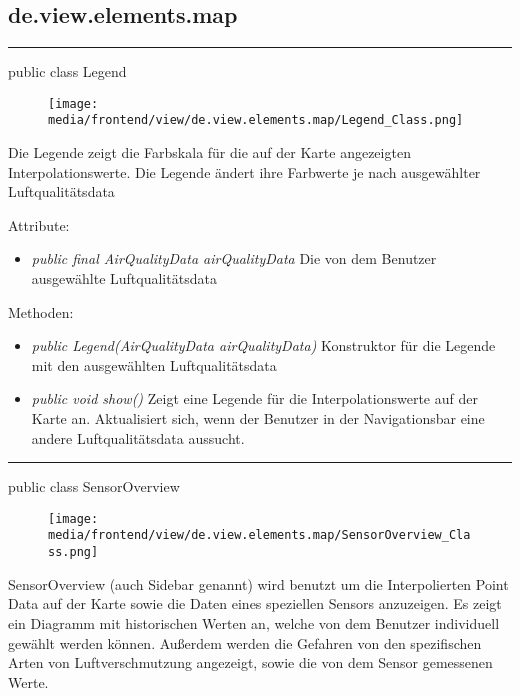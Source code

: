 \subsection{de.view.elements.map}

\rule{\textwidth}{0.4pt} 
public class Legend

\begin{minipage}{0.3\textwidth}
    \begin{figure}[H]
        \texttt{[image: media/frontend/view/de.view.elements.map/Legend\_Class.png]}
    \end{figure}
    \end{minipage} \hfill
    \begin{minipage}{0.6\textwidth}
Die Legende zeigt die Farbskala für die auf der Karte angezeigten Interpolationswerte. Die Legende ändert ihre Farbwerte je nach ausgewählter Luftqualitätsdata
\end{minipage}

Attribute:
\begin{itemize} 
    \item \emph{public final AirQualityData airQualityData} Die von dem Benutzer ausgewählte Luftqualitätsdata
\end{itemize} 
Methoden:
\begin{itemize}     
    \item \emph{public Legend(AirQualityData airQualityData)} Konstruktor für die Legende mit den ausgewählten Luftqualitätsdata
    \item \emph{public void show()} Zeigt eine Legende für die Interpolationswerte auf der Karte an. Aktualisiert sich, wenn der Benutzer in der Navigationsbar eine andere Luftqualitätsdata aussucht.
\end{itemize}

\rule{\textwidth}{0.4pt} 
public class SensorOverview

\begin{minipage}{0.4\textwidth}
    \begin{figure}[H]
        \texttt{[image: media/frontend/view/de.view.elements.map/SensorOverview\_Class.png]}
    \end{figure}
    \end{minipage} \hfill
    \begin{minipage}{0.4\textwidth}
SensorOverview (auch Sidebar genannt) wird benutzt um die Interpolierten Point Data auf der Karte sowie die Daten eines speziellen Sensors anzuzeigen. Es zeigt ein Diagramm mit historischen Werten an, welche von dem Benutzer individuell gewählt werden können. Außerdem werden die Gefahren von den spezifischen Arten von Luftverschmutzung angezeigt, sowie die von dem Sensor gemessenen Werte.
\end{minipage}

